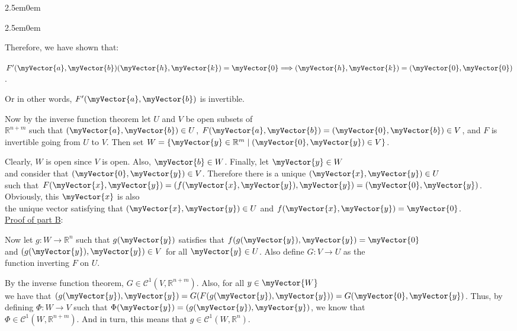 \documentclass{book}
\newenvironment{myIndent}{%
   \begin{adjustwidth}{2.5em}{0em}%
}{%
   \end{adjustwidth}%
}
\newcommand{\retTwo}{\hfill\bigbreak}
\newcommand{\mVec}[1]{\myVector{#1}}
\begin{document}
{\begin{myIndent}
{\begin{myIndent}
      Therefore, we have shown that:
      
      {\centering $F^\prime(\mVec{a}, \mVec{b})(\mVec{h}, \mVec{k}) = \mVec{0} \Longrightarrow (\mVec{h}, \mVec{k}) = (\mVec{0}, \mVec{0})$.\retTwo\par}

      Or in other words, $F^\prime(\mVec{a}, \mVec{b})$ is invertible.\retTwo

      Now by the inverse function theorem let $U$ and $V$ be open subsets of\\ $\mathbb{R}^{n + m}$ such that $(\mVec{a}, \mVec{b}) \in U$,\hspace{0.4em} $F(\mVec{a}, \mVec{b}) = (\mVec{0}, \mVec{b}) \in V$, and $F$ is\\ invertible going from $U$ to $V$. Then set $W = \{\mVec{y} \in \mathbb{R}^m \mid (\mVec{0}, \mVec{y}) \in V\}$.\retTwo

      Clearly, $W$ is open since $V$ is open. Also, $\mVec{b} \in W$. Finally, let $\mVec{y} \in W$\\ and consider that $(\mVec{0}, \mVec{y}) \in V$. Therefore there is a unique $(\mVec{x}, \mVec{y}) \in U$\\ such that $F(\mVec{x}, \mVec{y}) = (f(\mVec{x}, \mVec{y}), \mVec{y}) = (\mVec{0}, \mVec{y})$. Obviously, this $\mVec{x}$ is also\\ the unique vector satisfying that $(\mVec{x}, \mVec{y}) \in U$ and $f(\mVec{x}, \mVec{y}) = \mVec{0}$.\\ [9pt]

      \ul{Proof of part B}:\retTwo

      Now let $g: W \longrightarrow \mathbb{R}^n$ such that $g(\mVec{y})$ satisfies that $f(g(\mVec{y}), \mVec{y}) = \mVec{0}$\\ and $(g(\mVec{y}), \mVec{y}) \in V$ for all $\mVec{y} \in U$. Also define $G: V \longrightarrow U$ as the\\ function inverting $F$ on $U$.

      \newpage

      By the inverse function theorem, $G \in \mathscr{C}^1(V, \mathbb{R}^{n + m})$. Also, for all $y \in \mVec{W}$\\ we have that $(g(\mVec{y}), \mVec{y}) = G(F(g(\mVec{y}), \mVec{y})) = G(\mVec{0}, \mVec{y})$. Thus, by\\ defining $\Phi: W \longrightarrow V$ such that $\Phi(\mVec{y}) = (g(\mVec{y}), \mVec{y})$, we know that\\ $\Phi \in \mathscr{C}^1(W, \mathbb{R}^{n + m})$. And in turn, this means that $g \in \mathscr{C}^1(W, \mathbb{R}^n)$.\retTwo


\end{myIndent}}
\end{myIndent}}
\end{document}
